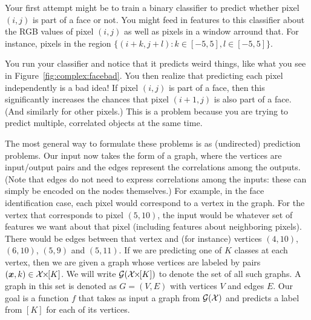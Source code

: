 Your first attempt might be to train a binary classifier to predict
whether pixel $(i,j)$ is part of a face or not.  You might feed in
features to this classifier about the RGB values of pixel $(i,j)$ as
well as pixels in a window arround that.  For instance, pixels in the
region $\{(i+k,j+l) : k \in [-5,5], l \in [-5,5]\}$.


You run your classifier and notice that it predicts weird things, like
what you see in Figure~\ref{fig:complex:facebad}.  You then realize
that predicting each pixel independently is a bad idea!  If pixel
$(i,j)$ is part of a face, then this significantly increases the
chances that pixel $(i+1,j)$ is also part of a face.  (And similarly
for other pixels.)  This is a 
problem because you are trying to predict multiple, correlated objects
at the same time.


The most general way to formulate these problems is as (undirected)
 prediction problems.  Our input now takes the form of
a graph, where the vertices are input/output pairs and the edges
represent the correlations among the outputs.  (Note that edges do not
need to express correlations among the inputs: these can simply be
encoded on the nodes themselves.)  For example, in the face
identification case, each pixel would correspond to a vertex in the
graph.  For the vertex that corresponds to pixel $(5,10)$, the input
would be whatever set of features we want about that pixel (including
features about neighboring pixels).  There would be edges between that
vertex and (for instance) vertices $(4,10)$, $(6,10)$, $(5,9)$ and
$(5,11)$.  If we are predicting one of $K$ classes at each vertex,
then we are given a graph whose vertices are labeled by pairs $(\vx,k)
\in \cX \times [K]$.  We will write $\cG(\cX\times[K])$ to denote the
set of all such graphs.  A graph in this set is denoted as $G=(V,E)$
with vertices $V$ and edges $E$.  Our goal is a function $f$ that
takes as input a graph from $\mathcal{G}(\mathcal{X})$ and predicts a label from $[K]$
for each of its vertices.


